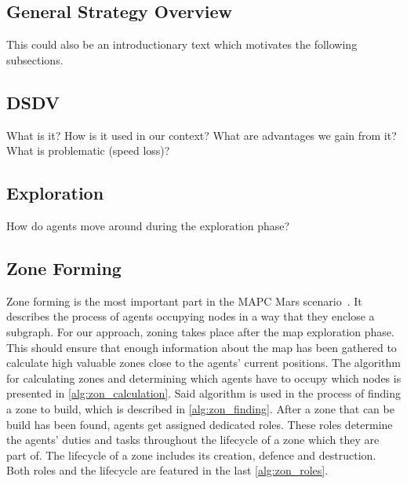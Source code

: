 \subsection{General Strategy Overview}
This could also be an introductionary text which motivates the following subsections.


\subsection{DSDV}
What is it? How is it used in our context? What are advantages we gain from it? What is problematic (speed loss)?

\subsection{Exploration}\label{alg:exploration}
How do agents move around during the exploration phase?

\subsection[Zone Finding]{Zone Forming}
Zone forming is the most important part in the MAPC Mars scenario~\cite{ahlbrecht_mapc_2014}.%
It describes the process of agents occupying nodes in a way that they enclose a subgraph. For our approach, zoning takes place after the map exploration phase. This should ensure that enough information about the map has been gathered to calculate high valuable zones close to the agents' current positions. The algorithm for calculating zones and determining which agents have to occupy which nodes is presented in \autoref{alg:zon_calculation}.
Said algorithm is used in the process of finding a zone to build, which is described in \autoref{alg:zon_finding}. After a zone that can be build has been found, agents get assigned dedicated roles. These roles determine the agents' duties and tasks throughout the lifecycle of a zone which they are part of. The lifecycle of a zone includes its creation, defence and destruction. Both roles and the lifecycle are featured in the last \autoref{alg:zon_roles}.




